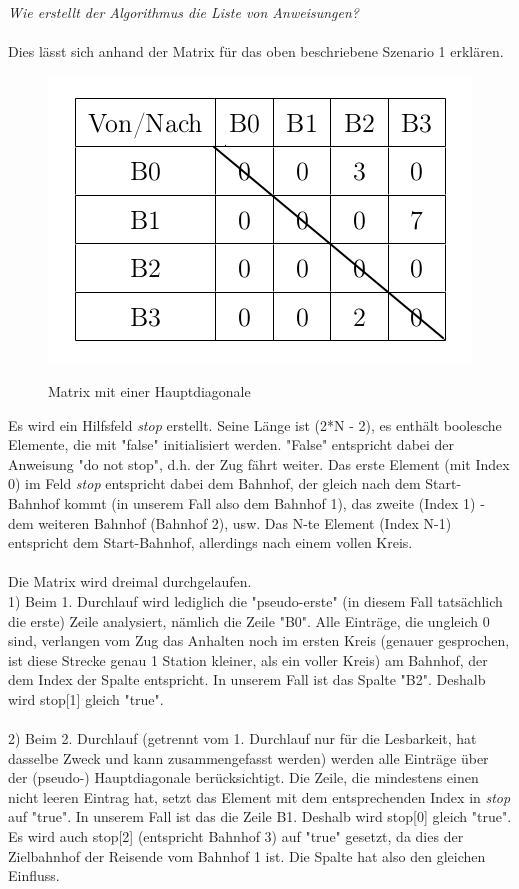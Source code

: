 \\
\textit{Wie erstellt der Algorithmus die Liste von Anweisungen?\\}
\\
Dies lässt sich anhand der Matrix für das oben beschriebene Szenario 1 erklären.\\
\begin{figure}[H]	
\caption{Matrix mit einer Hauptdiagonale}
\center
\includegraphics[width=2\textwidth, width=310pt]{content/images/matrix.png}
\label{pic:Hauptdiagonale}
\end{figure}
\noindent
Es wird ein Hilfsfeld \textit{stop} erstellt. Seine Länge ist (2*N - 2), es enthält boolesche Elemente, die mit "false" initialisiert werden. "False" entspricht dabei der Anweisung "do not stop", d.h. der Zug fährt weiter. Das erste Element (mit Index 0) im Feld \textit{stop} entspricht dabei dem Bahnhof, der gleich nach dem Start-Bahnhof kommt (in unserem Fall also dem Bahnhof 1), das zweite (Index 1) - dem weiteren Bahnhof (Bahnhof 2), usw. Das N-te Element (Index N-1) entspricht dem Start-Bahnhof, allerdings nach einem vollen Kreis.\\
\\
Die Matrix wird dreimal durchgelaufen.\\
1) Beim 1. Durchlauf wird lediglich die "pseudo-erste" (in diesem Fall tatsächlich die erste) Zeile analysiert, nämlich die Zeile "B0". Alle Einträge, die ungleich 0 sind, verlangen vom Zug das Anhalten noch im ersten Kreis (genauer gesprochen, ist diese Strecke genau 1 Station kleiner, als ein voller Kreis) am Bahnhof, der dem Index der Spalte entspricht. In unserem Fall ist das Spalte "B2". Deshalb wird stop[1] gleich "true".\\
\\
2) Beim 2. Durchlauf (getrennt vom 1. Durchlauf nur für die Lesbarkeit, hat dasselbe Zweck und kann zusammengefasst werden) werden alle Einträge über der (pseudo-) Hauptdiagonale berücksichtigt. Die Zeile, die mindestens einen nicht leeren Eintrag hat, setzt das Element mit dem entsprechenden Index in \textit{stop} auf "true". In unserem Fall ist das die Zeile B1. Deshalb wird stop[0] gleich "true". Es wird auch stop[2] (entspricht Bahnhof 3) auf "true" gesetzt, da dies der Zielbahnhof der Reisende vom Bahnhof 1 ist. Die Spalte hat also den gleichen Einfluss.\\
